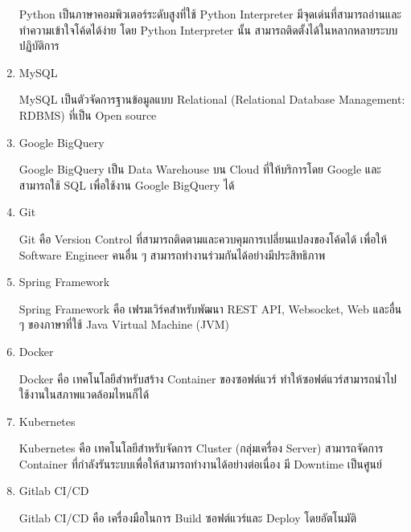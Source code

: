 \begin{enumerate}
	Python เป็นภาษาคอมพิวเตอร์ระดับสูงที่ใช้ Python Interpreter มีจุดเด่นที่สามารถอ่านและทำความเข้าใจโค้ดได้ง่าย โดย Python Interpreter นั้น สามารถติดตั้งได้ในหลากหลายระบบปฏิบัติการ  ~\cite{python}	
	\item MySQL
	
	MySQL เป็นตัวจัดการฐานข้อมูลแบบ Relational (Relational Database Management: RDBMS) ที่เป็น Open source ~\cite{mysql}
	\item Google BigQuery
	
	Google BigQuery เป็น Data Warehouse บน Cloud ที่ให้บริการโดย Google และสามารถใช้ SQL เพื่อใช้งาน Google BigQuery ได้ ~\cite{bigquery}
	\item Git
	
	Git คือ Version Control ที่สามารถติดตามและควบคุมการเปลี่ยนแปลงของโค้ดได้ เพื่อให้ Software Engineer คนอื่น ๆ สามารถทำงานร่วมกันได้อย่างมีประสิทธิภาพ ~\cite{git}
	\item Spring Framework
	
	Spring Framework คือ เฟรมเวิร์คสำหรับพัฒนา REST API, Websocket, Web และอื่น ๆ ของภาษาที่ใช้ Java Virtual Machine (JVM) ~\cite{spring}
	\item Docker
	
	Docker คือ เทคโนโลยีสำหรับสร้าง Container ของซอฟต์แวร์ ทำให้ซอฟต์แวร์สามารถนำไปใช้งานในสภาพแวดล้อมไหนก็ได้ ~\cite{docker}
	\item Kubernetes

	Kubernetes คือ เทคโนโลยีสำหรับจัดการ Cluster (กลุ่มเครื่อง Server) สามารถจัดการ Container ที่กำลังรันระบบเพื่อให้สามารถทำงานได้อย่างต่อเนื่อง มี Downtime เป็นศูนย์ ~\cite{kubernetes}
	\item Gitlab CI/CD
	
	Gitlab CI/CD คือ เครื่องมือในการ Build ซอฟต์แวร์และ Deploy โดยอัตโนมัติ ~\cite{gitlabcicd}
\end{enumerate}

